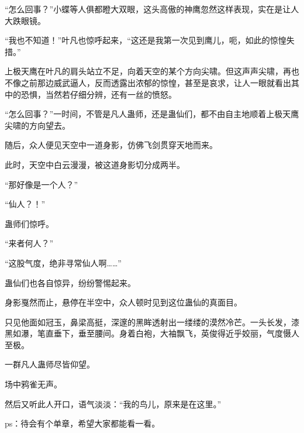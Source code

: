 \begin{this_body}
“怎么回事？”小蝶等人俱都瞪大双眼，这头高傲的神鹰忽然这样表现，实在是让人大跌眼镜。

“我也不知道！”叶凡也惊呼起来，“这还是我第一次见到鹰儿，呃，如此的惊惶失措。”

上极天鹰在叶凡的肩头站立不足，向着天空的某个方向尖啸。但这声声尖啸，再也不像之前那边威武逼人，反而透露出浓郁的惊惶，甚至是哀求，让人一眼就看出其中的恐惧，当然若仔细分辨，还有一丝的愤怒。

“怎么回事？”一时间，不管是凡人蛊师，还是蛊仙们，都不由自主地顺着上极天鹰尖啸的方向望去。

随后，众人便见天空中一道身影，仿佛飞剑贯穿天地而来。

此时，天空中白云漫漫，被这道身影切分成两半。

“那好像是一个人？”

“仙人？！”

蛊师们惊呼。

“来者何人？”

“这股气度，绝非寻常仙人啊……”

蛊仙们也各自惊异，纷纷警惕起来。

身影戛然而止，悬停在半空中，众人顿时见到这位蛊仙的真面目。

只见他面如冠玉，鼻梁高挺，深邃的黑眸透射出一缕缕的漠然冷芒。一头长发，漆黑如瀑，笔直垂下，垂至腰间。身着白袍，大袖飘飞，英俊得近乎姣丽，气度慑人至极。

一群凡人蛊师尽皆仰望。

场中鸦雀无声。

然后又听此人开口，语气淡淡：“我的鸟儿，原来是在这里。”

ps：待会有个单章，希望大家都能看一看。

\end{this_body}
